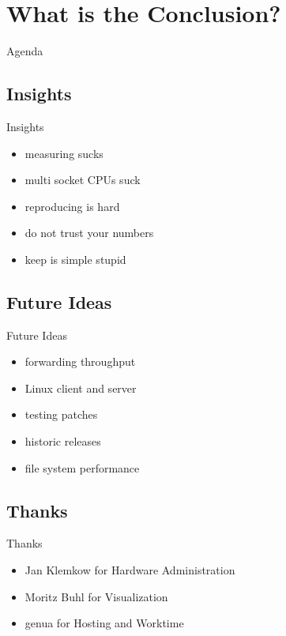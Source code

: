 \documentclass[14pt,aspectratio=169]{beamer}
\begin{document}
\section{What is the Conclusion?}

\begin{frame}{Agenda}
\setcounter{tocdepth}{1}
\tableofcontents[currentsection]
\end{frame}

\subsection{Insights}
\begin{frame}{Insights}
\begin{itemize}
    \item measuring sucks
    \item multi socket CPUs suck
    \item reproducing is hard
    \item do not trust your numbers
    \item keep is simple stupid
\end{itemize}
\end{frame}

\subsection{Future Ideas}
\begin{frame}{Future Ideas}
\begin{itemize}
    \item forwarding throughput
    \item Linux client and server
    \item testing patches
    \item historic releases
    \item file system performance
\end{itemize}
\end{frame}

\subsection{Thanks}
\begin{frame}{Thanks}
\begin{itemize}
    \item Jan Klemkow for Hardware Administration
    \item Moritz Buhl for Visualization
    \item genua for Hosting and Worktime
\end{itemize}
\end{frame}
\end{document}
